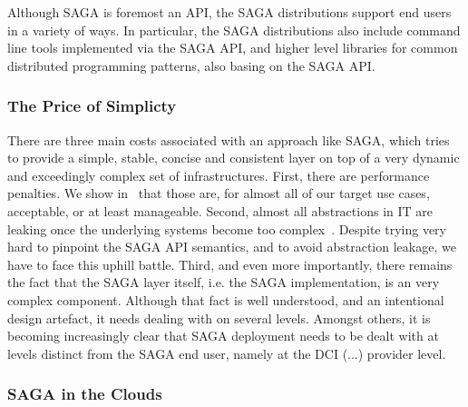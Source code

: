 \documentclass[10pt,conference,final,letterpaper,twoside,twocolumn,]{IEEEtran}
\begin{document}
 Although SAGA is foremost an API, the SAGA distributions support end
 users in a variety of ways.  In particular, the SAGA distributions
 also include command line tools implemented via the SAGA API, and
 higher level libraries for common distributed programming patterns,
 also basing on the SAGA API.


 \subsubsection*{The Price of Simplicty\cite{sagaprice}}

  There are three main costs associated with an approach like SAGA,
  which tries to provide a simple, stable, concise and consistent
  layer on top of a very dynamic and exceedingly complex set of
  infrastructures.  First, there are performance penalties.  We show
  in~\cite{sagaperf} that those are, for almost all of our target use
  cases, acceptable, or at least manageable.  Second, almost all
  abstractions in IT are leaking once the underlying systems become
  too complex~\cite{leaky_abstractions}.  Despite trying very hard to
  pinpoint the SAGA API semantics, and to avoid abstraction leakage,
  we have to face this uphill battle.  Third, and even more
  importantly, there remains the fact that the SAGA layer itself, i.e.
  the SAGA implementation, is an very complex component.  Although
  that fact is well understood, and an intentional design artefact, it
  needs dealing with on several levels.  Amongst others, it is
  becoming increasingly clear that SAGA deployment needs to be dealt
  with at levels distinct from the SAGA end user, namely at the DCI
  (...) provider level.


 \subsubsection*{SAGA in the Clouds}
\end{document}
